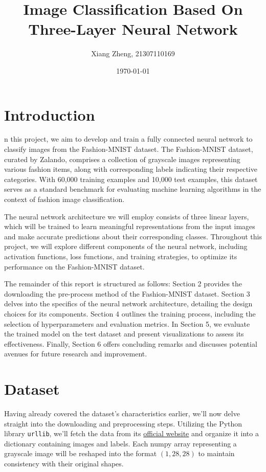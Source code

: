 \documentclass[10pt,a4paper,twoside]{tau}
\title{Image Classification Based On Three-Layer Neural Network}
\author[]{Xiang Zheng, 21307110169}
\affil[]{School of Data Science, Fudan University}
\date{\today}
\begin{document}
		
\maketitle
\thispagestyle{firststyle}
\tauabstract

\section{Introduction}

n this project, we aim to develop and train a fully connected neural network to classify images from the Fashion-MNIST dataset. The Fashion-MNIST dataset, curated by Zalando, comprises a collection of grayscale images representing various fashion items, along with corresponding labels indicating their respective categories. With 60,000 training examples and 10,000 test examples, this dataset serves as a standard benchmark for evaluating machine learning algorithms in the context of fashion image classification.

The neural network architecture we will employ consists of three linear layers, which will be trained to learn meaningful representations from the input images and make accurate predictions about their corresponding classes. Throughout this project, we will explore different components of the neural network, including activation functions, loss functions, and training strategies, to optimize its performance on the Fashion-MNIST dataset.

The remainder of this report is structured as follows: Section 2 provides the downloading the pre-process method of the Fashion-MNIST dataset. Section 3 delves into the specifics of the neural network architecture, detailing the design choices for its components. Section 4 outlines the training process, including the selection of hyperparameters and evaluation metrics. In Section 5, we evaluate the trained model on the test dataset and present visualizations to assess its effectiveness. Finally, Section 6 offers concluding remarks and discusses potential avenues for future research and improvement.

\section{Dataset}

Having already covered the dataset's characteristics earlier, we'll now delve straight into the downloading and preprocessing steps. Utilizing the Python library \texttt{urllib}, we'll fetch the data from its \href{https://github.com/zalandoresearch/fashion-mnist}{official website} and organize it into a dictionary containing images and labels. Each numpy array representing a grayscale image will be reshaped into the format $(1, 28, 28)$ to maintain consistency with their original shapes.
\end{document}
